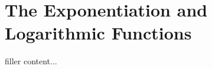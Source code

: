 \section{The Exponentiation and Logarithmic Functions}\label{sec:the-exponentiation-and-logarithmic-functions}

filler content...

